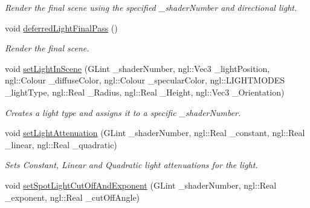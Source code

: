 \begin{DoxyCompactItemize}
\begin{DoxyCompactList}\small\item\em Render the final scene using the specified \-\_\-shader\-Number and directional light. \end{DoxyCompactList}\item 
\hypertarget{class_deferred_shading_af8fb86b0971f5b2e0fbb01d0fdeb1351}{void \hyperlink{class_deferred_shading_af8fb86b0971f5b2e0fbb01d0fdeb1351}{deferred\-Light\-Final\-Pass} ()}\label{class_deferred_shading_af8fb86b0971f5b2e0fbb01d0fdeb1351}

\begin{DoxyCompactList}\small\item\em Render the final scene. \end{DoxyCompactList}\item 
\hypertarget{class_deferred_shading_a8032518b51fccbc065f2f545b219c799}{void \hyperlink{class_deferred_shading_a8032518b51fccbc065f2f545b219c799}{set\-Light\-In\-Scene} (G\-Lint \-\_\-shader\-Number, ngl\-::\-Vec3 \-\_\-light\-Position, ngl\-::\-Colour \-\_\-diffuse\-Color, ngl\-::\-Colour \-\_\-specular\-Color, ngl\-::\-L\-I\-G\-H\-T\-M\-O\-D\-E\-S \-\_\-light\-Type, ngl\-::\-Real \-\_\-\-Radius, ngl\-::\-Real \-\_\-\-Height, ngl\-::\-Vec3 \-\_\-\-Orientation)}\label{class_deferred_shading_a8032518b51fccbc065f2f545b219c799}

\begin{DoxyCompactList}\small\item\em Creates a light type and assigns it to a specific \-\_\-shader\-Number. \end{DoxyCompactList}\item 
\hypertarget{class_deferred_shading_acb695a85a8a9ebf6a0504eb127ad35c7}{void \hyperlink{class_deferred_shading_acb695a85a8a9ebf6a0504eb127ad35c7}{set\-Light\-Attenuation} (G\-Lint \-\_\-shader\-Number, ngl\-::\-Real \-\_\-constant, ngl\-::\-Real \-\_\-linear, ngl\-::\-Real \-\_\-quadratic)}\label{class_deferred_shading_acb695a85a8a9ebf6a0504eb127ad35c7}

\begin{DoxyCompactList}\small\item\em Sets Constant, Linear and Quadratic light attenuations for the light. \end{DoxyCompactList}\item 
\hypertarget{class_deferred_shading_ab3d67842a956c661a6790a5f501853a0}{void \hyperlink{class_deferred_shading_ab3d67842a956c661a6790a5f501853a0}{set\-Spot\-Light\-Cut\-Off\-And\-Exponent} (G\-Lint \-\_\-shader\-Number, ngl\-::\-Real \-\_\-exponent, ngl\-::\-Real \-\_\-cut\-Off\-Angle)}\label{class_deferred_shading_ab3d67842a956c661a6790a5f501853a0}


\end{DoxyCompactItemize}
